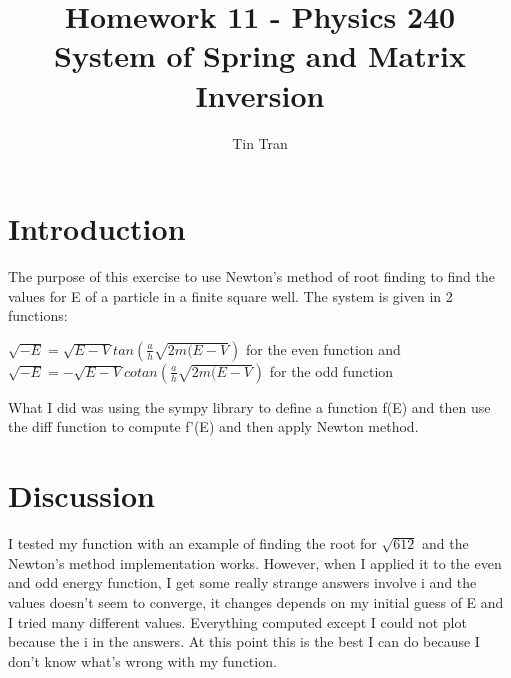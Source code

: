 \documentclass{article}
\begin{document}
\title{Homework 11 - Physics 240\\
		System of Spring and Matrix Inversion}
\author{Tin Tran}

\maketitle

\section{Introduction}
The purpose of this exercise to use Newton's method of root finding to find the values for E of a particle in a finite square well. The system is given in 2 functions:\\
\begin{center}
$\sqrt{-E} = \sqrt{E-V}tan(\frac{a}{h}\sqrt{2m(E-V})$ for the even function and \\

$\sqrt{-E} = -\sqrt{E-V}cotan(\frac{a}{h}\sqrt{2m(E-V})$ for the odd function
\end{center}
\indent What I did was using the sympy library to define a function f(E) and then use the diff function to compute f'(E) and then apply Newton method.
\section{Discussion}
I tested my function with an example of finding the root for $\sqrt{612}$ and the Newton's method implementation works. However, when I applied it to the even and odd energy function, I get some really strange answers involve i and the values doesn't seem to converge, it changes depends on my initial guess of E and I tried many different values. Everything computed except I could not plot because the i in the answers. At this point this is the best I can do because I don't know what's wrong with my function.
\end{document}
